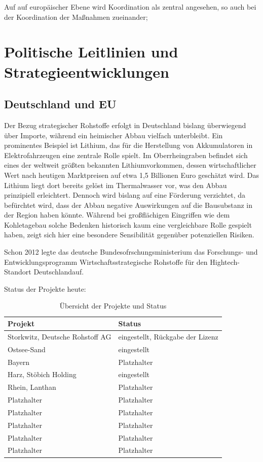 \documentclass[12pt,a4paper,oneside]{book} %
\begin{document}
Auf auf europäischer Ebene wird Koordination als zentral angesehen, so auch bei der Koordination der Maßnahmen zueinander;

\section{Politische Leitlinien und Strategieentwicklungen}

\subsection{Deutschland und EU}

Der Bezug strategischer Rohstoffe erfolgt in Deutschland bislang überwiegend über Importe, während ein heimischer Abbau vielfach unterbleibt. Ein prominentes Beispiel ist Lithium, das für die Herstellung von Akkumulatoren in Elektrofahrzeugen eine zentrale Rolle spielt. Im Oberrheingraben befindet sich eines der weltweit größten bekannten Lithiumvorkommen, dessen wirtschaftlicher Wert nach heutigen Marktpreisen auf etwa 1,5 Billionen Euro geschätzt wird. Das Lithium liegt dort bereits gelöst im Thermalwasser vor, was den Abbau prinzipiell erleichtert. Dennoch wird bislang auf eine Förderung verzichtet, da befürchtet wird, dass der Abbau negative Auswirkungen auf die Bausubstanz in der Region haben könnte. Während bei großflächigen Eingriffen wie dem Kohletagebau solche Bedenken historisch kaum eine vergleichbare Rolle gespielt haben, zeigt sich hier eine besondere Sensibilität gegenüber potenziellen Risiken.


Schon 2012 legte das deutsche Bundesofrschungsministerium das Forschungs- und Entwicklungsprogramm \glqq Wirtschaftsstrategische Rohstoffe für den Hightech-Standort Deutschland\grqq auf.

Status der Projekte heute:

\begin{table}[ht]
	\centering
	\begin{tabular}{p{6cm} p{6cm}}
		\toprule
		\textbf{Projekt} & \textbf{Status} \\
		\midrule
		Storkwitz, Deutsche Rohstoff AG & eingestellt, Rückgabe der Lizenz \\
		Ostsee-Sand & eingestellt \\
		Bayern & Platzhalter \\
		Harz, Stöbich Holding & eingestellt \\
		Rhein, Lanthan & Platzhalter \\
		Platzhalter & Platzhalter \\
		Platzhalter & Platzhalter \\
		Platzhalter & Platzhalter \\
		Platzhalter & Platzhalter \\
		Platzhalter & Platzhalter \\
		\bottomrule
	\end{tabular}
	\caption{Übersicht der Projekte und Status}
	\label{tab:projekt_status}
\end{table}
\end{document}
